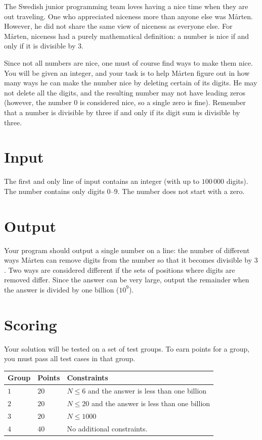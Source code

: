 The Swedish junior programming team loves having a nice time when they
are out traveling. One who appreciated niceness more than anyone else was Mårten.
However, he did not share the same view of niceness as everyone else. For Mårten,
niceness had a purely mathematical definition: a number is nice if and
only if it is divisible by 3.

Since not all numbers are nice, one must of course find ways to make them
nice. You will be given an integer, and your task is to help Mårten
figure out in how many ways he can make the number nice by deleting certain
of its digits. He may not delete all the digits, and the resulting
number may not have leading zeros (however, the number $0$ is considered nice,
so a single zero is fine). Remember that a number is divisible by three if
and only if its digit sum is divisible by three.

\section*{Input}
The first and only line of input contains an integer (with up to $100\,000$
digits). The number contains only digits $0$--$9$. The number does not start with a zero.

\section*{Output}
Your program should output a single number on a line: the number of different ways
Mårten can remove digits from the number so that it becomes divisible by $3$. Two ways
are considered different if the sets of positions where digits are removed differ. Since
the answer can be very large, output the remainder when the answer is divided by one billion ($10^9$).

\section*{Scoring}
Your solution will be tested on a set of test groups.
To earn points for a group, you must pass all test cases in that group.

\noindent
\begin{tabular}{| l | l | l |}
  \hline
  \textbf{Group} & \textbf{Points} & \textbf{Constraints} \\ \hline
  $1$   & $20$       & $N \leq 6$ and the answer is less than one billion \\ \hline
  $2$   & $20$       & $N \leq 20$ and the answer is less than one billion \\ \hline
  $3$   & $20$       & $N \leq 1000$ \\ \hline
  $4$   & $40$       & No additional constraints. \\ \hline
\end{tabular}

